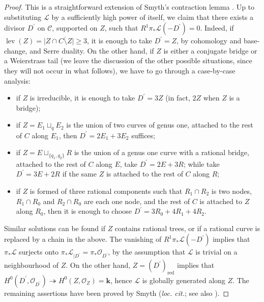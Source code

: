 \documentclass[11pt]{amsart}
\renewcommand{\k}{\mathbf k}
\newcommand{\OO}{\mathcal O}
\newcommand{\lev}{\operatorname{lev}}
\theoremstyle{plain}
\theoremstyle{definition}
\begin{document}
\begin{proof}
 This is a straightforward extension of Smyth's contraction lemma \cite[Lemma 2.13]{SMY1}. Up to substituting $\mathcal L$ by a sufficiently high power of itself, we claim that there exists a divisor $D^\prime$ on $\mathcal C$, supported on $Z$, such that $R^1\pi_*\mathcal L(-D^\prime)=0$. Indeed, if $\lev(Z)=\lvert Z\cap\overline{C\setminus Z}\rvert\geq 3$, it is enough to take $D^\prime=Z$, by cohomology and base-change, and Serre duality. On the other hand, if $Z$ is either a conjugate bridge or a Weierstrass tail (we leave the discussion of the other possible situations, since they will not occur in what follows), we have to go through a case-by-case analysis:
 \begin{itemize}[leftmargin=.3cm]
  \item if $Z$ is irreducible, it is enough to take $D^\prime=3Z$ (in fact, $2Z$ when $Z$ is a bridge);
  \item if $Z=E_1\sqcup_q E_2$ is the union of two curves of genus one, attached to the rest of $C$ along $E_1$, then $D^\prime=2E_1+3E_2$ suffices;
  \item if $Z=E\sqcup_{\{q_1,q_2\}} R$ is the union of a genus one curve with a rational bridge, attached to the rest of $C$ along $E$, take $D^\prime=2E+3R$; while take $D^\prime=3E+2R$ if the same $Z$ is attached to the rest of $C$ along $R$;
  \item if $Z$ is formed of three rational components such that $R_1\cap R_2$ is two nodes, $R_1\cap R_0$ and $R_2\cap R_0$ are each one node, and the rest of $C$ is attached to $Z$ along $R_0$, then it is enough to choose $D^\prime=3R_0+4R_1+4R_2$.
 \end{itemize}
 Similar solutions can be found if $Z$ contains rational trees, or if a rational curve is replaced by a chain in the above. The vanishing of $R^1\pi_*\mathcal L(-D^\prime)$ implies that $\pi_*\mathcal L$ surjects onto $\pi_*\mathcal L_{|D^\prime}=\pi_*\OO_{D^\prime}$, by the assumption that $\mathcal L$ is trivial on a neighbourhood of $Z$. On the other hand, $Z=(D^\prime)_{\mathrm{red}}$ implies that $H^0(D^\prime,\OO_{D^\prime})\twoheadrightarrow H^0(Z,\OO_Z)=\k$, hence $\mathcal L$ is globally generated along $Z$. The remaining assertions have been proved by Smyth (\emph{loc. cit.}; see also \cite[Proposition 3.7.3.1]{RSPW1}). 
\end{proof}
\end{document}

